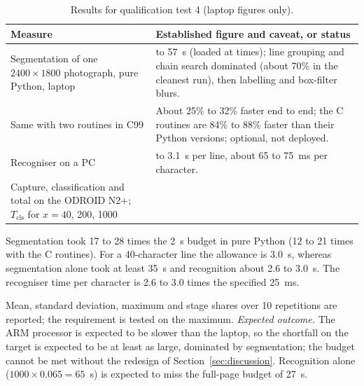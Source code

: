 \begin{table}[h]
\centering
\fontsize{10}{12}\selectfont
\begin{tabularx}{\linewidth}{|>{\raggedright\arraybackslash}p{4.5cm}|>{\raggedright\arraybackslash}X|}
\hline
\textbf{Measure} & \textbf{Established figure and caveat, or status} \\
\hline
Segmentation of one $2400\times1800$ photograph, pure Python, laptop & 35 to 57~s (loaded at times); line grouping and chain search dominated (about 70\% in the cleanest run), then labelling and box-filter blurs. \\
\hline
Same with two routines in C99 & About 25\% to 32\% faster end to end; the C routines are 84\% to 88\% faster than their Python versions; optional, not deployed. \\
\hline
Recogniser on a PC & 2.6 to 3.1~s per line, about 65 to 75~ms per character. \\
\hline
Capture, classification and total on the ODROID N2+; $T_{\mathrm{cls}}$ for $x=40$, 200, 1000 & \nym{} \\
\hline
\end{tabularx}
\caption{Results for qualification test 4 (laptop figures only).}
\label{tab:res-r4}
\end{table}


            Segmentation took 17 to 28 times the 2~s budget in pure Python (12 to 21 times with the C routines).
            For a 40-character line the allowance is 3.0~s, whereas segmentation alone took at least 35~s and recognition about 2.6 to 3.0~s.
            The recogniser time per character is 2.6 to 3.0 times the specified 25~ms.


            Mean, standard deviation, maximum and stage shares over 10 repetitions are reported; the requirement is tested on the maximum.
            \emph{Expected outcome.}
            The ARM processor is expected to be slower than the laptop, so the shortfall on the target is expected to be at least as large, dominated by segmentation; the budget cannot be met without the redesign of Section~\ref{sec:discussion}.
            Recognition alone ($1000\times0.065=65$~s) is expected to miss the full-page budget of 27~s.


